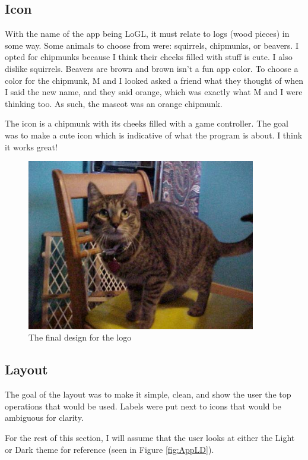\subsection{Icon}

With the name of the app being LoGL, it must relate to logs (wood
pieces) in some way.
Some animals to choose from were: squirrels, chipmunks, or beavers. I
opted for chipmunks because I think their cheeks filled with stuff is
cute. I also dislike squirrels. Beavers are brown and brown
isn't a fun app color. To choose a color for the chipmunk, M and I
looked asked a friend what they thought of when I said the new name,
and they said orange, which was exactly what M and I were thinking too.
As such, the mascot was an orange chipmunk.

The icon is a chipmunk with its cheeks filled with a game controller.
The goal was to make a cute icon which is indicative of what the
program is about. I think it works great!

\begin{figure}[htb]
	\centering
	\includegraphics[width=10cm]{./Images/cats_00001.jpg}
	\caption{The final design for the logo}
	\label{fig:Mascot}
\end{figure}

\subsection{Layout}

The goal of the layout was to make it simple, clean, and show the
user the top operations that would be used.
Labels were put next to icons that would be ambiguous for clarity.

For the rest of this section, I will assume that the user looks at
either the Light or Dark theme for reference (seen in Figure \ref{fig:AppLD}).


